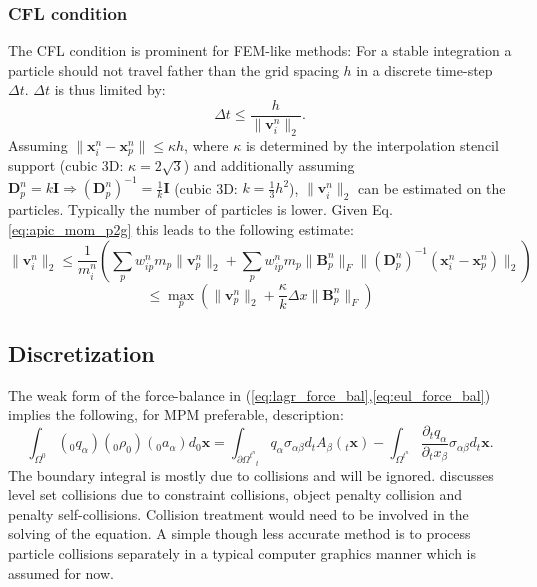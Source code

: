 \documentclass[m,times]{cgMA}
\begin{document}
\subsubsection{CFL condition} \label{sec:cfl}
The CFL condition is prominent for FEM-like methods: For a stable integration a particle should not travel father than the grid spacing $h$ in a discrete time-step $\Delta t$. $\Delta t$ is thus limited by:
\begin{equation}
  \Delta t \leq \frac{h}{\|\boldsymbol{v}^n_i\|_2}.
\end{equation}
Assuming $\|\boldsymbol{x}_i^n -\boldsymbol{x}_p^n\| \leq \kappa h$, where $\kappa$ is determined by the interpolation stencil support (cubic 3D: $\kappa = 2\sqrt{3}$) and additionally assuming $\boldsymbol{D}_p^n = k\boldsymbol{I} \Rightarrow (\boldsymbol{D}_p^n)^{-1} = \frac{1}{k}\boldsymbol{I}$ (cubic 3D: $k=\frac{1}{3}h^2$),
$\|\boldsymbol{v}^n_i\|_2$ can be estimated on the particles. Typically the number of particles is lower. Given Eq. \ref{eq:apic_mom_p2g} this leads to the following estimate:
$$
\|\boldsymbol{v}^n_i\|_2 \leq \frac{1}{m_i^n}\left(\sum _ { p } w _ { i p } ^ { n } m _ { p } \| \boldsymbol { v } _ { p } ^ { n } \|_2 + \sum _ { p } w _ { i p } ^ { n } m _ { p } \| \boldsymbol { B } _ { p } ^ { n } \| _ { F } \| ( \boldsymbol { D } _ { p } ^ { n } ) ^ { - 1 } ( \boldsymbol { x } _ { i } ^ { n } - \boldsymbol { x } _ { p } ^ { n } ) \|_2\right)
$$
\begin{equation}
\leq \max _ { p } ( \| \boldsymbol { v } _ { p } ^ { n } \|_2 + \frac { \kappa } { k } \Delta x \| \boldsymbol { B } _ { p } ^ { n } \| _ { F } )
\end{equation}
\begin{flushright}\cite{MPM:APIC}\end{flushright}
\subsection{Discretization}\label{sec:discretization}
The weak form of the force-balance in (\ref{eq:lagr_force_bal},\ref{eq:eul_force_bal}) implies the following, for MPM preferable, description:
\begin{equation} \label{eq:weak_mpm}
  \int _ { \Omega ^ { 0 } } (_0q _ \alpha) (_0\rho_0) (_0a _\alpha)  d _0\boldsymbol{x}= \int _ { \partial \Omega ^ { t^n } } _tq _ \alpha \sigma _ {\alpha\beta} d_tA_\beta(_t\boldsymbol{x}) -  \int _ { \Omega ^ { t^n} } \frac{\partial _tq _ \alpha}{\partial _tx_\beta} \sigma _ {\alpha\beta} d_t\boldsymbol{x}.
\end{equation}
The boundary integral is mostly due to collisions and will be ignored. \cite{MPM:OPTIMI_INTEGR} discusses level set collisions due to constraint collisions, object penalty collision and penalty self-collisions. Collision treatment would need to be involved in the solving of the equation. A simple though less accurate method is to process particle collisions separately in a typical computer graphics manner which is assumed for now.
\end{document}
